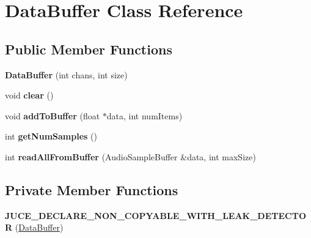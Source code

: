 \hypertarget{classDataBuffer}{\section{Data\-Buffer Class Reference}
\label{classDataBuffer}
}
\subsection*{Public Member Functions}
\begin{DoxyCompactItemize}
\item 
\hypertarget{classDataBuffer_a05ce6a6b3a4be03dbe2ec15173a51c7c}{{\bfseries Data\-Buffer} (int chans, int size)}\label{classDataBuffer_a05ce6a6b3a4be03dbe2ec15173a51c7c}

\item 
\hypertarget{classDataBuffer_ac114fa2ba9b9ad0545b6f846dc098c21}{void {\bfseries clear} ()}\label{classDataBuffer_ac114fa2ba9b9ad0545b6f846dc098c21}

\item 
\hypertarget{classDataBuffer_a5cc06461e64712fbc015dcab84de51e3}{void {\bfseries add\-To\-Buffer} (float $\ast$data, int num\-Items)}\label{classDataBuffer_a5cc06461e64712fbc015dcab84de51e3}

\item 
\hypertarget{classDataBuffer_a7594cd0003317cb88e732215ba664c58}{int {\bfseries get\-Num\-Samples} ()}\label{classDataBuffer_a7594cd0003317cb88e732215ba664c58}

\item 
\hypertarget{classDataBuffer_ad2e746f7588cf608580f9b652bdf8bf7}{int {\bfseries read\-All\-From\-Buffer} (Audio\-Sample\-Buffer \&data, int max\-Size)}\label{classDataBuffer_ad2e746f7588cf608580f9b652bdf8bf7}

\end{DoxyCompactItemize}
\subsection*{Private Member Functions}
\begin{DoxyCompactItemize}
\item 
\hypertarget{classDataBuffer_aedd1c980c44c5f353cf4fcc1653ca9eb}{{\bfseries J\-U\-C\-E\-\_\-\-D\-E\-C\-L\-A\-R\-E\-\_\-\-N\-O\-N\-\_\-\-C\-O\-P\-Y\-A\-B\-L\-E\-\_\-\-W\-I\-T\-H\-\_\-\-L\-E\-A\-K\-\_\-\-D\-E\-T\-E\-C\-T\-O\-R} (\hyperlink{classDataBuffer}{Data\-Buffer})}\label{classDataBuffer_aedd1c980c44c5f353cf4fcc1653ca9eb}

\end{DoxyCompactItemize}
